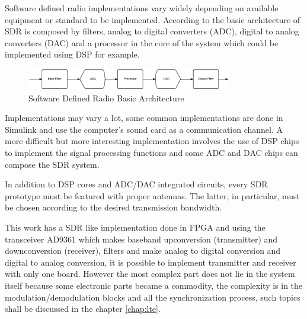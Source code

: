 Software defined radio implementations vary widely depending on available
equipment or standard to be implemented. According to \cite{ladimer2009} the basic
architecture of SDR is composed by filters, analog to digital converters (ADC),
digital to analog converters (DAC) and a processor in the core of the system
which could be implemented using DSP for example.

\begin{figure}[htbp]
    \centering
    \includegraphics[width=0.8\textwidth]{./figures/sdr_basic_arch}
    \caption{ Software Defined Radio Basic Architecture
    \label{fig:sdr_basic}}
\end{figure}


Implementations may vary a lot, some common implementations are done in Simulink
and use the computer’s sound card as a communication channel. A more difficult
but more interesting implementation involves the use of DSP chips to implement
the signal processing functions and some ADC and DAC chips can compose the SDR
system.

In addition to DSP cores and ADC/DAC integrated circuits, every SDR prototype
must be featured with proper antennas. The latter, in particular, must be
chosen according to the desired transmission bandwidth.

%

This work has a SDR like implementation done in FPGA and using the transceiver
AD9361 which makes baseband upconversion (transmitter) and downconversion
(receiver), filters and make analog to digital conversion and digital to analog
conversion, it is possible to implement transmitter and receiver with only
one board. However the most complex part does not lie in the system itself
because some electronic parts became a commodity, the complexity is in the
modulation/demodulation blocks and all the synchronization process, such topics
shall be discussed in the chapter \ref{chap:lte}.
